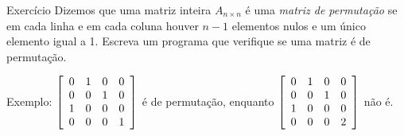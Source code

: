 \documentclass[hyperref={pdfpagelabels=false}]{beamer}
\begin{document}
\begin{frame}{Exercício}
  Dizemos que uma matriz inteira $A_{n\times n}$ é uma \emph{matriz de permutação} se em cada linha e em cada coluna houver $n-1$ elementos nulos e um único elemento igual a 1. Escreva um programa que verifique se uma matriz é de permutação.

Exemplo:
\begin{math}
\left[
   \begin{array}{c c c c}
      0&1&0&0\\
      0&0&1&0\\
      1&0&0&0\\
      0&0&0&1
   \end{array}\right]
\end{math}
é de permutação, enquanto
\begin{math}
\left[
   \begin{array}{c c c c}
      0&1&0&0\\
      0&0&1&0\\
      1&0&0&0\\
      0&0&0&2
   \end{array}\right]
\end{math}
não é.
\end{frame}
\end{document}
